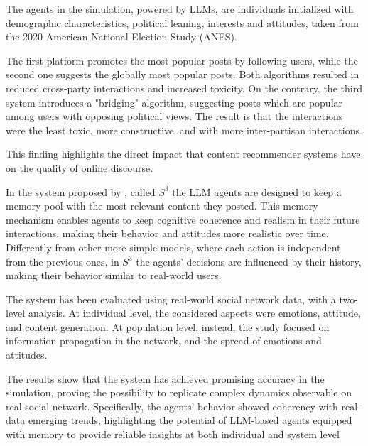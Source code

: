 The agents in the simulation, powered by LLMs, are individuals initialized with demographic characteristics, political leaning, interests and attitudes, taken from the 2020 American National Election Study (ANES).

The first platform promotes the most popular posts by following users, while the second one suggests the globally most popular posts. Both algorithms resulted in reduced cross-party interactions and increased toxicity.
On the contrary, the third system introduces a "bridging" algorithm, suggesting posts which are popular among users with opposing political views. The result is that the interactions were the least toxic, more constructive, and with more inter-partisan interactions.

This finding highlights the direct impact that content recommender systems have on the quality of online discourse.

\medskip
In the system proposed by \citet{gao2023s3socialnetworksimulationlarge}, called $S^3$ the LLM agents are designed to keep a memory pool with the most relevant content they posted. 
This memory mechanism enables agents to keep  cognitive coherence and realism in their future interactions, making their behavior and attitudes more realistic over time.
Differently from other more simple models, where each action is independent from the previous ones, in $S^3$ the agents' decisions are influenced by their history, making their behavior similar to real-world users.

The system has been evaluated using real-world social network data, with a two-level analysis.
At individual level, the considered aspects were emotions, attitude, and content generation. At population level, instead, the study focused on information propagation in the network, and the spread of emotions and attitudes.

The results show that the system has achieved promising accuracy in the simulation, proving the possibility to replicate complex dynamics observable on real social network.
Specifically, the agents' behavior showed coherency with real-data emerging trends, highlighting the potential of LLM-based agents equipped with memory to provide reliable insights at both individual and system level


